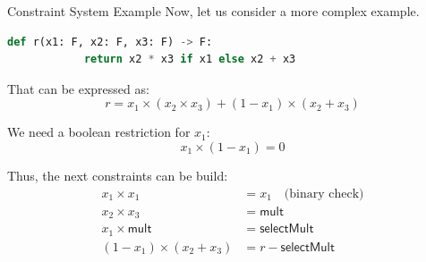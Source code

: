 \documentclass{beamer}
\begin{document}
    \begin{frame}[fragile]{Constraint System Example}
        Now, let us consider a more complex example.
        \begin{lstlisting}[language=Python,numbers=none]
        def r(x1: F, x2: F, x3: F) -> F:
            return x2 * x3 if x1 else x2 + x3
        \end{lstlisting}
        That can be expressed as:
        \begin{equation*}
            r = x_1 \times (x_2 \times x_3) + (1 - x_1) \times (x_2 + x_3)
        \end{equation*}
        
        \pause
        \begin{alertblock}{}
            We need a boolean restriction for $x_1$:
            \vspace{-8pt}
            \begin{equation*}
                x_1 \times (1 - x_1) = 0
            \end{equation*}
        \end{alertblock}

        \pause
        Thus, the next constraints can be build:
        \vspace{-5pt}
        \begin{align*}
            x_1 \times x_1 &= x_1 \quad \text{(binary check)} \tag{1} \\
            x_2 \times x_3 &= \mathsf{mult} \tag{2} \\
            x_1 \times \mathsf{mult} &= \mathsf{selectMult} \tag{3} \\
            (1 - x_1) \times (x_2 + x_3) &= r - \mathsf{selectMult} \tag{4}
        \end{align*}
    \end{frame}
\end{document}
